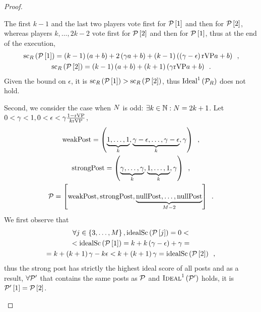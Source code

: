 \begin{proof}
\begin{itemize}
    The first $k - 1$ and the last two players vote first for
    $\mathcal{P}\left[1\right]$ and then for $\mathcal{P}\left[2\right]$, whereas
    players $k, \dots, 2k - 2$ vote first for $\mathcal{P}\left[2\right]$ and then
    for $\mathcal{P}\left[1\right]$, thus at the end of the execution,
    \begin{gather*}
      \mathrm{sc}_{R}\left(\mathcal{P}\left[1\right]\right) = \left(k -
      1\right)\left(a + b\right) + 2\left(\gamma a + b\right) + \left(k -
      1\right)\left(\left(\gamma - \epsilon\right)\mathrm{rVP} a + b\right) \enspace, \\
      \mathrm{sc}_{R}\left(\mathcal{P}\left[2\right]\right) = \left(k -
      1\right)\left(a + b\right) + \left(k + 1\right)\left(\gamma \mathrm{rVP} a +
      b\right) \enspace.
    \end{gather*}
    Given the bound on $\epsilon$, it is
    $\mathrm{sc}_{R}\left(\mathcal{P}\left[1\right]\right) >
    \mathrm{sc}_{R}\left(\mathcal{P}\left[2\right]\right)$, thus
    $\mathrm{Ideal}^1\left(\mathcal{P}_{R}\right)$ does not hold.

    Second, we consider the case when $N$ is odd: $\exists k \in
    \mathbb{N}: N = 2k + 1$. Let $0 < \gamma < 1, 0 <
    \epsilon < \gamma \frac{1 - \mathrm{rVP}}{k\mathrm{rVP}}$,
    \begin{gather*}
      \mathrm{weakPost} = \left(\underbrace{1, \dots, 1}_{k}, \underbrace{\gamma -
      \epsilon, \dots, \gamma - \epsilon}_{k}, \gamma\right) \enspace, \\
      \mathrm{strongPost} = \left(\underbrace{\gamma, \dots, \gamma}_{k}, \underbrace{1,
      \dots, 1}_{k}, \gamma\right) \enspace, \\
      \mathcal{P} = \left[\mathrm{weakPost}, \mathrm{strongPost}, \underbrace{\mathrm{nullPost}, \dots,
      \mathrm{nullPost}}_{M - 2}\right] \enspace.
    \end{gather*}
    We first observe that
    \begin{gather*}
      \forall j \in \left\{3, \dots, M\right\},
      \mathrm{idealSc}\left(\mathcal{P}\left[j\right]\right) = 0 < \\
      < \mathrm{idealSc}\left(\mathcal{P}\left[1\right]\right) = k + k\left(\gamma - \epsilon\right) +
      \gamma = \\
      = k + \left(k + 1\right)\gamma -k\epsilon < k + \left(k + 1\right)\gamma =
      \mathrm{idealSc}\left(\mathcal{P}\left[2\right]\right) \enspace,
    \end{gather*}
    thus the strong post has strictly the highest ideal score of all posts and
    as a result, $\forall \mathcal{P}'$ that contains the same posts as
    $\mathcal{P}$ and $\textsc{Ideal}^1\left(\mathcal{P}'\right)$ holds, it is
    $\mathcal{P}'\left[1\right] = \mathcal{P}\left[2\right]$.


\end{itemize}
\end{proof}
